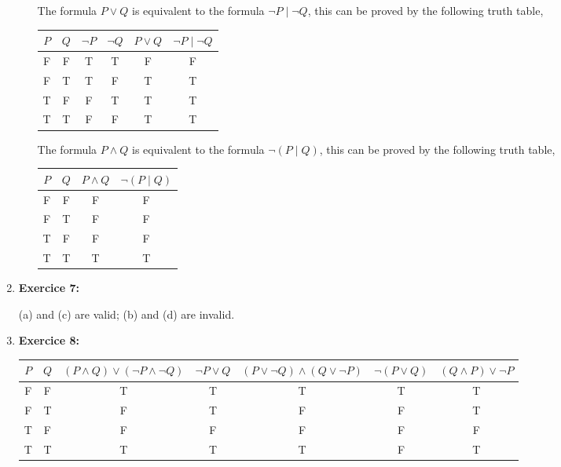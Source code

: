 \documentclass{article} %
\begin{document}
\begin{enumerate}
\begin{itemize}
        The formula $P \lor Q$ is equivalent to the formula $\neg P \mid \neg Q$, this can be proved by the following truth table,
        \begin{center}
        \begin{tabular}{cccccc}
            $P$ & $Q$ & $\neg P$ & $\neg Q$ & $P \lor Q$ & $\neg P \mid \neg Q$ \\
            \hline
            F & F & T & T & F & F \\
            F & T & T & F & T & T \\
            T & F & F & T & T & T \\
            T & T & F & F & T & T \\
        \end{tabular}
        \end{center}

        The formula $P \land Q$ is equivalent to the formula $\neg (P \mid Q)$, this can be proved by the following truth table,

        \begin{center}
        \begin{tabular}{cccc}
            $P$ & $Q$ & $P \land Q$ & $\neg (P \mid Q)$ \\
            \hline
            F & F & F & F \\
            F & T & F & F \\
            T & F & F & F \\
            T & T & T & T \\
        \end{tabular}
        \end{center}

    \end{itemize}

    \item \textbf{Exercice 7:}

    (a) and (c) are valid; (b) and (d) are invalid. 

    \item \textbf{Exercice 8:}
    \begin{center}
    \begin{tabular}{ccccccc}
        $P$ & $Q$ & $(P \land Q) \lor (\neg P \land \neg Q)$ & $\neg P \lor Q$ & $(P \lor \neg Q) \land (Q \lor \neg P)$ & $\neg (P \lor Q)$ & $(Q \land P) \lor \neg P$ \\
        \hline
        F & F & T & T & T & T & T \\
        F & T & F & T & F & F & T \\
        T & F & F & F & F & F & F \\
        T & T & T & T & T & F & T \\
    \end{tabular}
    \end{center}


\end{enumerate}
\end{document}
